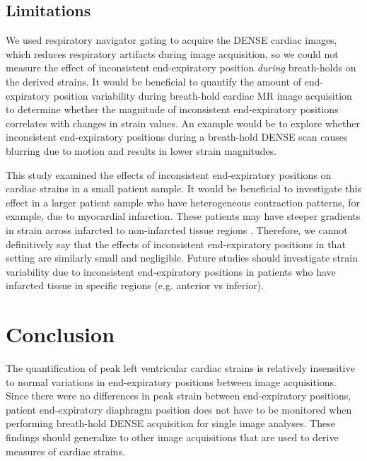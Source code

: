 \subsection{Limitations}
	We used respiratory navigator gating to acquire the DENSE cardiac images, which reduces respiratory artifacts during image acquisition, so we could not measure the effect of inconsistent end-expiratory position \textit{during} breath-holds on the derived strains. It would be beneficial to quantify the amount of end-expiratory position variability during breath-hold cardiac MR image acquisition to determine whether the magnitude of inconsistent end-expiratory positions correlates with changes in strain values. An example would be to explore whether inconsistent end-expiratory positions during a breath-hold DENSE scan causes blurring due to motion and results in lower strain magnitudes.
	
	This study examined the effects of inconsistent end-expiratory positions on cardiac strains in a small patient sample. It would be beneficial to investigate this effect in a larger patient sample who have heterogeneous contraction patterns, for example, due to myocardial infarction. These patients may have steeper gradients in strain across infarcted to non-infarcted tissue regions \cite{Pahlm2014}. Therefore, we cannot definitively say that the effects of inconsistent end-expiratory positions in that setting are similarly small and negligible. Future studies should investigate strain variability due to inconsistent end-expiratory positions in patients who have infarcted tissue in specific regions (e.g. anterior vs inferior).

\section{Conclusion}
	The quantification of peak left ventricular cardiac strains is relatively insensitive to normal variations in end-expiratory positions between image acquisitions. Since there were no differences in peak strain between end-expiratory positions, patient end-expiratory diaphragm position does not have to be monitored when performing breath-hold DENSE acquisition for single image analyses. These findings should generalize to other image acquisitions that are used to derive measures of cardiac strains.
	
	
	
